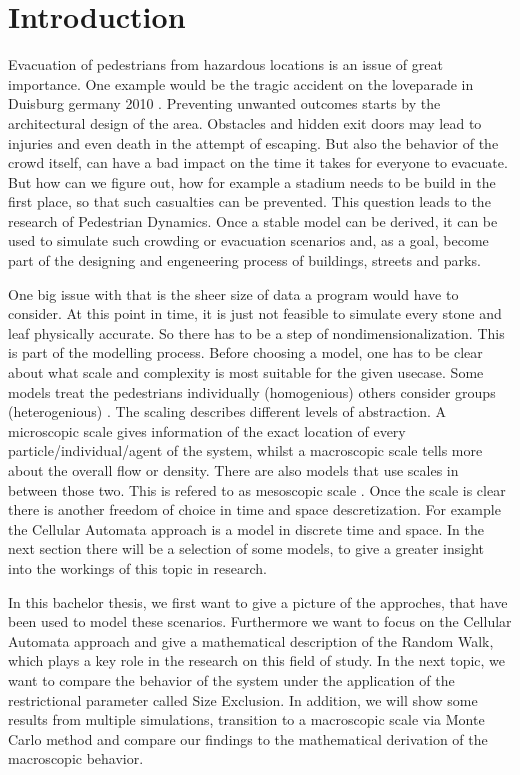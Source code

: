 

\section{Introduction}

Evacuation of pedestrians from hazardous locations is an issue of great importance. 
One example would be the tragic accident on the loveparade in Duisburg germany 2010 \cite{loveparade}.
Preventing unwanted outcomes starts by the architectural design of the area.
Obstacles and hidden exit doors may lead to injuries and even death in the attempt of escaping.
But also the behavior of the crowd itself, can have a bad impact on the time it takes for everyone to evacuate.
But how can we figure out, how for example a stadium needs to be build in the first place, so that such casualties can be prevented.
This question leads to the research of Pedestrian Dynamics. 
Once a stable model can be derived, it can be used to simulate such crowding or evacuation scenarios and, as a goal, 
become part of the designing and engeneering process of buildings, streets and parks.

One big issue with that is the sheer size of data a program would have to consider. 
At this point in time, it is just not feasible to simulate every stone and leaf physically accurate.
So there has to be a step of nondimensionalization. 
This is part of the modelling process. 
Before choosing a model, one has to be clear about what scale and complexity is most suitable for the given usecase.
Some models treat the pedestrians individually  (homogenious) others consider groups (heterogenious) \cite{zheng2009modeling}.
The scaling describes different levels of abstraction.
A microscopic scale gives information of the exact location of every particle/individual/agent of the system,
whilst a macroscopic scale tells more about the overall flow or density. There are also models that use scales in between 
those two. This is refered to as mesoscopic scale \cite{Michi}. 
Once the scale is clear there is another freedom of choice in time and space descretization. 
For example the Cellular Automata approach is a model in discrete time and space. 
In the next section there will be a selection of some models, to give a greater insight into the workings of this topic in research.

In this bachelor thesis, we first want to give a picture of the approches, that have been used to model these scenarios. 
Furthermore we want to focus on the Cellular Automata approach and give a mathematical description of the Random Walk, 
which plays a key role in the research on this field of study. 
In the next topic, we want to compare the behavior of the system under the application of the restrictional parameter called Size Exclusion.
In addition, we will show some results from multiple simulations, transition to a macroscopic scale via Monte Carlo method and compare our findings to 
the mathematical derivation of the macroscopic behavior. 

